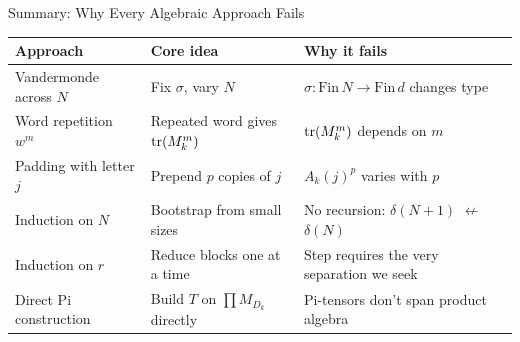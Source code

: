 \documentclass[aspectratio=169,10pt]{beamer}
\begin{document}
\begin{frame}{Summary: Why Every Algebraic Approach Fails}
\vspace{-0.3em}
\begin{center}
\renewcommand{\arraystretch}{1.35}
{\small
\begin{tabular}{>{\raggedright}p{3.2cm} >{\raggedright}p{4.5cm} >{\raggedright\arraybackslash}p{4.2cm}}
\hline
\textbf{Approach} & \textbf{Core idea} & \textbf{Why it fails} \\
\hline
\textcolor{softred}{Vandermonde across $N$} &
Fix $\sigma$, vary $N$ &
$\sigma : \mathrm{Fin}\,N \to \mathrm{Fin}\,d$ changes type \\[0.1em]

\textcolor{softred}{Word repetition $w^m$} &
Repeated word gives $\mathrm{tr}(M_k^m)$ &
$\mathrm{tr}(M_k^m)$ depends on $m$ \\[0.1em]

\textcolor{softred}{Padding with letter $j$} &
Prepend $p$ copies of $j$ &
$A_k(j)^p$ varies with $p$ \\[0.1em]

\textcolor{softred}{Induction on $N$} &
Bootstrap from small sizes &
No recursion: $\delta(N{+}1)$ $\not\leftarrow$ $\delta(N)$ \\[0.1em]

\textcolor{softred}{Induction on $r$} &
Reduce blocks one at a time &
Step requires the very separation we seek \\[0.1em]

\textcolor{softred}{Direct Pi construction} &
Build $T$ on $\prod M_{D_k}$ directly &
Pi-tensors don't span product algebra \\
\hline
\end{tabular}}
\end{center}

\vspace{0.5em}
\begin{center}
\end{center}
\end{frame}
\end{document}
